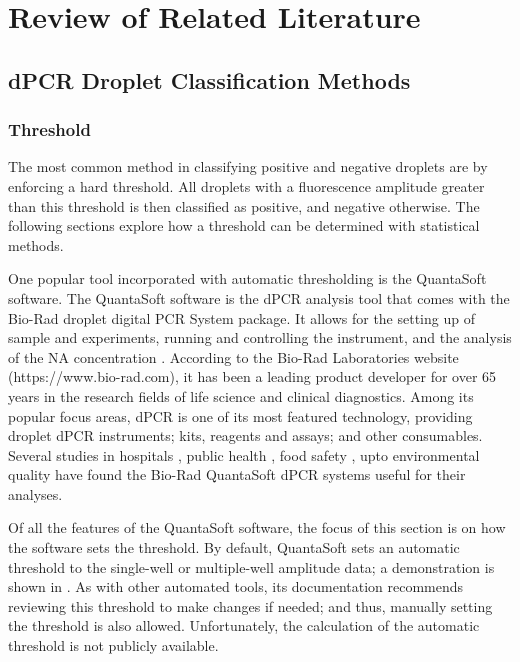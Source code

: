 \chapter{Review of Related Literature}
\label{sec:rrl} 

\section{dPCR Droplet Classification Methods}
\label{sec:dpcrclassifiers}

\subsection{Threshold}
\label{sec:threshold}
The most common method in classifying positive and negative droplets are by enforcing a hard threshold. All droplets with a fluorescence amplitude greater than this threshold is then classified as positive, and negative otherwise. The following sections explore how a threshold can be determined with statistical methods.

One popular tool incorporated with automatic thresholding is the QuantaSoft software. The QuantaSoft software is the dPCR analysis tool that comes with the Bio-Rad droplet digital PCR System package. It allows for the setting up of sample and experiments, running and controlling the instrument, and the analysis of the NA concentration \cite{BioRad2019}. According to the Bio-Rad Laboratories website (https://www.bio-rad.com), it has been a leading product developer for over 65 years in the research fields of life science and clinical diagnostics. Among its popular focus areas, dPCR is one of its most featured technology, providing droplet dPCR instruments; kits, reagents and assays; and other consumables. Several studies in hospitals \cite{Lopez2016,Chen2018,Abed2017,Tagliapietra2020}, public health \cite{Hussain2017,Nystrand2018}, food safety \cite{Chen2020,Capobianco2020,Basanisi2020}, upto environmental quality \cite{Hamaguchi2018,Jahne2020,Dobnik2016,Mauvisseau2019} have found the Bio-Rad QuantaSoft dPCR systems useful for their analyses. 

Of all the features of the QuantaSoft software, the focus of this section is on how the software sets the threshold. By default, QuantaSoft sets an automatic threshold to the single-well or multiple-well amplitude data; a demonstration is shown in . As with other automated tools, its documentation recommends reviewing this threshold to make changes if needed; and thus, manually setting the threshold is also allowed. Unfortunately, the calculation of the automatic threshold is not publicly available.

